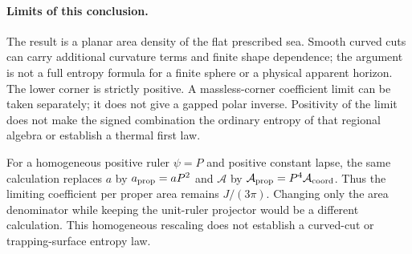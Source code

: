 \documentclass[10pt]{article}
\begin{document}
\paragraph{Limits of this conclusion.}
The result is a planar area density of the flat prescribed sea.
Smooth curved cuts can carry additional curvature terms and finite
shape dependence; the argument is not a full entropy formula for
a finite sphere or a physical apparent horizon. The lower corner
is strictly positive. A massless-corner coefficient limit can be
taken separately; it does not give a gapped polar inverse.
Positivity of the limit does not make the signed combination the
ordinary entropy of that regional algebra or establish a thermal
first law.

For a homogeneous positive ruler $\psi=P$ and positive constant
lapse, the same calculation replaces $a$ by $a_{\rm prop}=aP^2$
and $\mathcal A$ by $\mathcal A_{\rm prop}=P^4\mathcal A_{\rm coord}$.
Thus the limiting coefficient per proper area remains $J/(3\pi)$.
Changing only the area denominator while keeping the unit-ruler
projector would be a different calculation. This homogeneous
rescaling does not establish a curved-cut or trapping-surface
entropy law.
\end{document}
